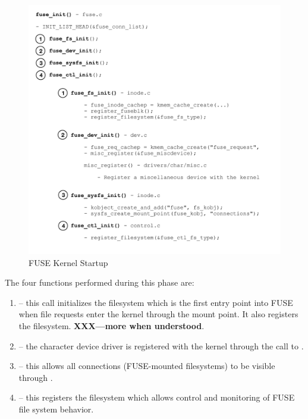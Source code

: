 \begin{figure}[h]
	\includegraphics[scale=0.6]{figures/fuse-startup.pdf}
	\centering
	\caption{FUSE Kernel Startup}
	\label{fig:fuse-startup}
\end{figure}

\noindent
The four functions performed during this phase are:

\begin{enumerate}
	\item {} -- this call initializes the  filesystem which is the first entry point into FUSE when
		file requests enter the kernel through the mount point. It also registers the  filesystem. 
		\textbf{XXX---more when understood}.
	\item {} -- the character device driver  is registered with the kernel through the
		call to .
	\item {} -- this allows all connections (FUSE-mounted filesystems) to be visible through
		.
	\item {} -- this registers the  filesystem which allows control and monitoring of  
		FUSE file system behavior.
\end{enumerate}

